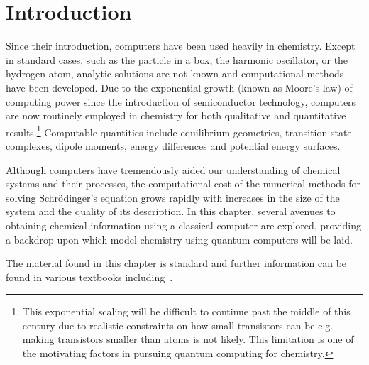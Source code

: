 \documentclass[11pt,oneside,final]{huthesis}%
\begin{document}
\section{Introduction}
Since their introduction, computers have been used heavily in chemistry.  Except in standard cases, such as the particle in a box, the harmonic oscillator, or the hydrogen atom, analytic solutions are not known and computational methods have been developed.  Due to the exponential growth (known as Moore's law) of computing power since the introduction of semiconductor technology, computers are now routinely employed in chemistry for both qualitative and quantitative results.\footnote{This exponential scaling will be difficult to continue past the middle of this century due to realistic constraints on how small transistors can be e.g. making transistors smaller than atoms is not likely.  This limitation is one of the motivating factors in pursuing quantum computing for chemistry.} Computable quantities include equilibrium geometries, transition state complexes, dipole moments, energy differences and potential energy surfaces.  

Although computers have tremendously aided our understanding of chemical systems and their processes, the computational cost of the numerical methods for solving Schr\"odinger's equation grows rapidly with increases in the size of the system and the quality of its description.  In this chapter, several avenues to obtaining chemical information using a classical computer are explored, providing a backdrop upon which model chemistry using quantum computers will be laid.

The material found in this chapter is standard and further information can be found in various textbooks including~\cite{Cramer04,Szabo96,Koch01,Helgaker00}.


\end{document}
